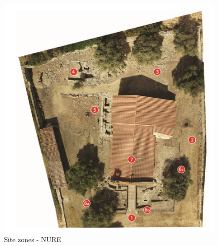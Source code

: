 \begin{figure}[h]
    \centering
    \includegraphics[width=\linewidth]{Figures/Conceptual Model/photoNURE/ortophoto.png}
    \caption{Site zones - NURE}
    \label{fig:ortophoto}
\end{figure}

